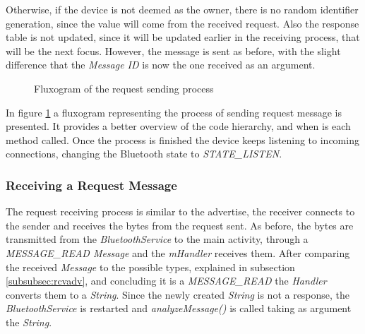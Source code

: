 Otherwise, if the device is not deemed as the owner, there is no random identifier generation, since the value will come from the received request. Also the response table is not updated, since it will be updated earlier in the receiving process, that will be the next focus. However, the message is sent as before, with the slight difference that the \textit{Message ID} is now the one received as an argument.

\begin{figure}[ht]
   \noindent{}
	\caption{\label{fig:rqtflux} Fluxogram of the request sending process}
\end{figure}

In figure \ref{fig:rqtflux} a fluxogram representing the process of sending request message is presented. It provides a better overview of the code hierarchy, and when is each method called. Once the process is finished the device keeps listening to incoming connections, changing the Bluetooth state to \textit{STATE\_LISTEN}.

\subsubsection{Receiving a Request Message}
\label{subsubsec:rcvrqt}

The request receiving process is similar to the advertise, the receiver connects to the sender and receives the bytes from the request sent. As before, the bytes are transmitted from the \textit{BluetoothService} to the main activity, through a \textit{MESSAGE\_READ Message} and the \textit{mHandler} receives them. After comparing the received \textit{Message} to the possible types, explained in subsection \ref{subsubsec:rcvadv}, and concluding it is a \textit{MESSAGE\_READ} the \textit{Handler} converts them to a \textit{String}. Since the newly created \textit{String} is not a response, the \textit{BluetoothService} is restarted and \textit{analyzeMessage()} is called taking as argument the \textit{String}.

